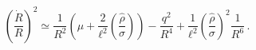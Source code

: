 \begin{equation}\left(\frac{\dot{R}}{R}\right)^2\simeq \frac{1}{R^2}
\left(\mu+\frac{2}{\ell^2}\left(\frac{\hat{\rho}}{\sigma}\right)\right)
-\frac{q^2}{R^4}+\frac{1}{\ell^2}\left(\frac{\hat{\rho}}{\sigma}\right)^2
\frac{1}{R^6}\,.\end{equation}

